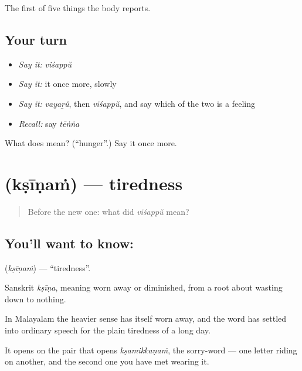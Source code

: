 \begin{grammarlens}[title={What you've built}]
The first of five things the body reports.
\end{grammarlens}

\subsection*{Your turn}
\begin{itemize}
\raggedright
  \item \emph{Say it:} \emph{viśappŭ}
  \item \emph{Say it:} it once more, slowly
  \item \emph{Say it:} \emph{vayaṟŭ}, then \emph{viśappŭ}, and say which of the two is a feeling
  \item \emph{Recall:} say \emph{tēṅṅa}
\end{itemize}

\begin{tcolorbox}[breakable,colback=teal!4,colframe=teal!35!black,title={Before you move on}]
What does  mean? (\textquotedblleft{}hunger\textquotedblright{}.) Say it once more.
\end{tcolorbox}
\section[\texorpdfstring{\ml{ക്ഷീണം} (kṣīṇaṁ)}{ക്ഷീണം (kṣīṇaṁ)}]{ (kṣīṇaṁ) — tiredness}

\label{lesson:ML-C63-tiredness}



\begin{quote}
Before the new one: what did \emph{viśappŭ} mean?
\end{quote}

\subsection*{You'll want to know: }
\textbf{} (\emph{kṣīṇaṁ}) — \textquotedblleft{}tiredness\textquotedblright{}.

Sanskrit \emph{kṣīṇa}, meaning worn away or diminished, from a root about wasting down to nothing.

In Malayalam the heavier sense has itself worn away, and the word has settled into ordinary speech for the plain tiredness of a long day.

It opens on the  pair that opens \emph{kṣamikkaṇaṁ}, the sorry-word — one letter riding on another, and the second one you have met wearing it.

